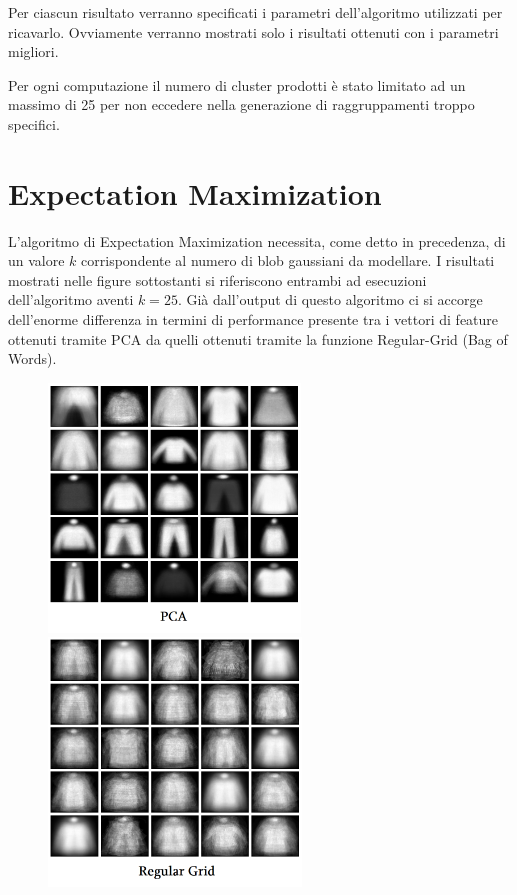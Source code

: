 \documentclass[]{report}
\begin{document}
	Per ciascun risultato verranno specificati i parametri dell'algoritmo utilizzati per ricavarlo. Ovviamente verranno mostrati solo i risultati ottenuti con i parametri migliori.  
	
	Per ogni computazione il numero di cluster prodotti è stato limitato ad un massimo di 25 per non eccedere nella generazione di raggruppamenti troppo specifici.
	
	\section*{Expectation Maximization}
	
	L'algoritmo di Expectation Maximization necessita, come detto in precedenza, di un valore $k$ corrispondente al numero di blob gaussiani da modellare. I risultati mostrati nelle figure sottostanti si riferiscono entrambi ad esecuzioni dell'algoritmo aventi $k = 25$.
	Già dall'output di questo algoritmo ci si accorge dell'enorme differenza in termini di performance presente tra i vettori di feature ottenuti tramite PCA da quelli ottenuti tramite la funzione Regular-Grid (Bag of Words).
	
	\begin{figure}[ht!]
		\includegraphics[width=.49\textwidth,height=250px]{./img/EM_PCA}\hfill
		\includegraphics[width=.49\textwidth,height=250px]{./img/EM_RG}
	\end{figure} 
	
\end{document}
